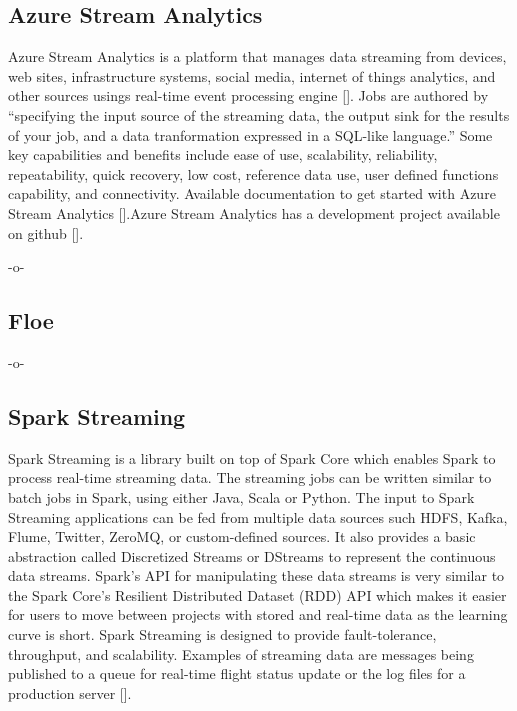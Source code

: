 \subsection{Azure Stream Analytics}

Azure Stream Analytics is a platform that manages data streaming from
devices, web sites, infrastructure systems, social media, internet of
things analytics, and other sources usings real-time event processing
engine [\cite{www-azurestreamanalytics}]. Jobs are authored by
``specifying the input source of the streaming data, the output sink
for the results of your job, and a data tranformation expressed in a
SQL-like language.''  Some key capabilities and benefits include ease
of use, scalability, reliability, repeatability, quick recovery, low
cost, reference data use, user defined functions capability, and
connectivity. Available documentation to get started with Azure Stream
Analytics [\cite{www-docs-microsoft}].Azure Stream Analytics has a
development project available on github [\cite{www-github-azure}].

     -o-

     
\subsection{Floe}

-o- 

\subsection{Spark Streaming}

Spark Streaming is a library built on top of Spark Core which enables
Spark to process real-time streaming data. The streaming jobs can be
written similar to batch jobs in Spark, using either Java, Scala or
Python. The input to Spark Streaming applications can be fed from
multiple data sources such HDFS, Kafka, Flume, Twitter, ZeroMQ, or
custom-defined sources. It also provides a basic abstraction called
Discretized Streams or DStreams to represent the continuous data
streams. Spark's API for manipulating these data streams is very
similar to the Spark Core's Resilient Distributed Dataset (RDD) API
which makes it easier for users to move between projects with stored
and real-time data as the learning curve is
short\cite{www-apache-spark-RDD}.  Spark Streaming is designed to
provide fault-tolerance, throughput, and scalability. Examples of
streaming data are messages being published to a queue for real-time
flight status update or the log files for a production
server [\cite{www-apache-spark-stream}].


